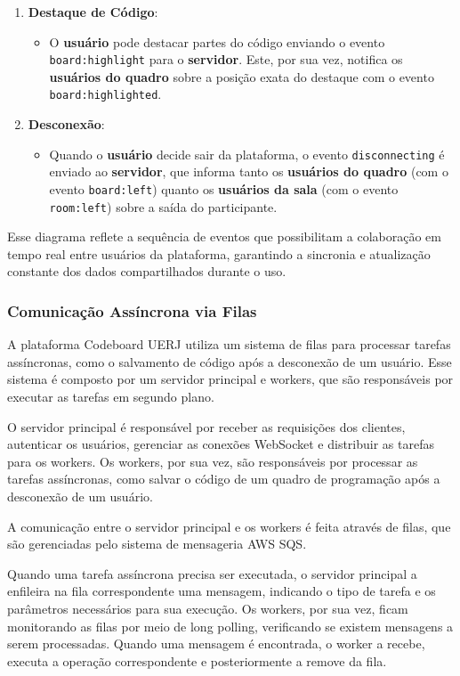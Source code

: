 \begin{enumerate}
    \item \textbf{Destaque de Código}:
    \begin{itemize}
        \item O \textbf{usuário} pode destacar partes do código enviando o evento \texttt{board:highlight} para o \textbf{servidor}. Este, por sua vez, notifica os \textbf{usuários do quadro} sobre a posição exata do destaque com o evento \texttt{board:highlighted}.
    \end{itemize}

    \item \textbf{Desconexão}:
    \begin{itemize}
        \item Quando o \textbf{usuário} decide sair da plataforma, o evento \texttt{disconnecting} é enviado ao \textbf{servidor}, que informa tanto os \textbf{usuários do quadro} (com o evento \texttt{board:left}) quanto os \textbf{usuários da sala} (com o evento \texttt{room:left}) sobre a saída do participante.
    \end{itemize}
\end{enumerate}

Esse diagrama reflete a sequência de eventos que possibilitam a colaboração em tempo real entre usuários da plataforma, garantindo a sincronia e atualização constante dos dados compartilhados durante o uso.


\subsubsection{Comunicação Assíncrona via Filas}

A plataforma Codeboard UERJ utiliza um sistema de filas para processar tarefas assíncronas, como o salvamento de código após a desconexão de um usuário. Esse sistema é composto por um servidor principal e workers, que são responsáveis por executar as tarefas em segundo plano.

O servidor principal é responsável por receber as requisições dos clientes, autenticar os usuários, gerenciar as conexões WebSocket e distribuir as tarefas para os workers. Os workers, por sua vez, são responsáveis por processar as tarefas assíncronas, como salvar o código de um quadro de programação após a desconexão de um usuário.

A comunicação entre o servidor principal e os workers é feita através de filas, que são gerenciadas pelo sistema de mensageria AWS SQS. 

Quando uma tarefa assíncrona precisa ser executada, o servidor principal a enfileira na fila correspondente uma mensagem, indicando o tipo de tarefa e os parâmetros necessários para sua execução. Os workers, por sua vez, ficam monitorando as filas por meio de long polling, verificando se existem mensagens a serem processadas. Quando uma mensagem é encontrada, o worker a recebe, executa a operação correspondente e posteriormente a remove da fila.


